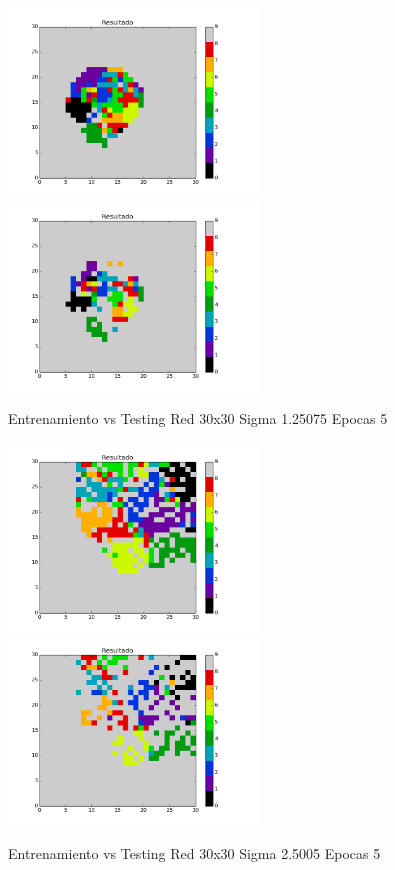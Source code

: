 \includegraphics[width=0.5\textwidth]{img/EJ2_Sigma/train_M_30_sigma_1_25075_epocas_5}
\includegraphics[width=0.5\textwidth]{img/EJ2_Sigma/test_M_30_sigma_1_25075_epocas_5}
{\center \footnotesize Entrenamiento vs Testing Red 30x30 Sigma 1.25075 Epocas 5\par}

\includegraphics[width=0.5\textwidth]{img/EJ2_Sigma/train_M_30_sigma_2_5005_epocas_5}
\includegraphics[width=0.5\textwidth]{img/EJ2_Sigma/test_M_30_sigma_2_5005_epocas_5}
{\center \footnotesize Entrenamiento vs Testing Red 30x30 Sigma 2.5005 Epocas 5\par}

